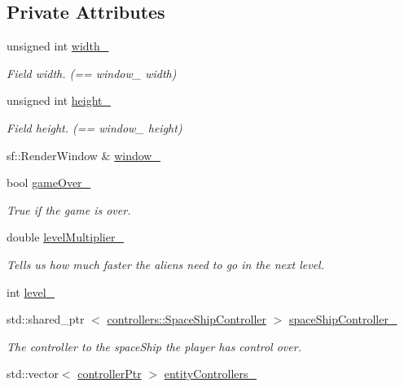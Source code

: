 \subsection*{\-Private \-Attributes}
\begin{DoxyCompactItemize}
\item 
unsigned int \hyperlink{classgame_1_1Game_a7fbf6984ea777ae7ab39d54d701f48e4}{width\-\_\-}
\begin{DoxyCompactList}\small\item\em \-Field width. (== window\-\_\- width) \end{DoxyCompactList}\item 
unsigned int \hyperlink{classgame_1_1Game_adaaa88157cd82d0c9b56d16015c6e3af}{height\-\_\-}
\begin{DoxyCompactList}\small\item\em \-Field height. (== window\-\_\- height) \end{DoxyCompactList}\item 
sf\-::\-Render\-Window \& \hyperlink{classgame_1_1Game_a64323f95d196a67f2c2fea232d6013d9}{window\-\_\-}
\item 
bool \hyperlink{classgame_1_1Game_ae044e3c64579c11cf381feb6a1e6f544}{game\-Over\-\_\-}
\begin{DoxyCompactList}\small\item\em \-True if the game is over. \end{DoxyCompactList}\item 
double \hyperlink{classgame_1_1Game_ad094ca2b5b1429682bf43f171c3896d5}{level\-Multiplier\-\_\-}
\begin{DoxyCompactList}\small\item\em \-Tells us how much faster the aliens need to go in the next level. \end{DoxyCompactList}\item 
int \hyperlink{classgame_1_1Game_a01f13242840529fa2be3c34c2c1ba1bc}{level\-\_\-}
\item 
std\-::shared\-\_\-ptr\*
$<$ \hyperlink{classcontrollers_1_1SpaceShipController}{controllers\-::\-Space\-Ship\-Controller} $>$ \hyperlink{classgame_1_1Game_a9893f7b2da64105ba99fb9826269ff37}{space\-Ship\-Controller\-\_\-}
\begin{DoxyCompactList}\small\item\em \-The controller to the space\-Ship the player has control over. \end{DoxyCompactList}\item 
std\-::vector$<$ \hyperlink{Game_8h_a21b04f6cf2d5990b82725fac5ea2ce9a}{controller\-Ptr} $>$ \hyperlink{classgame_1_1Game_af37911d1058a047b3465015c768f7fd5}{entity\-Controllers\-\_\-}

\end{DoxyCompactItemize}
